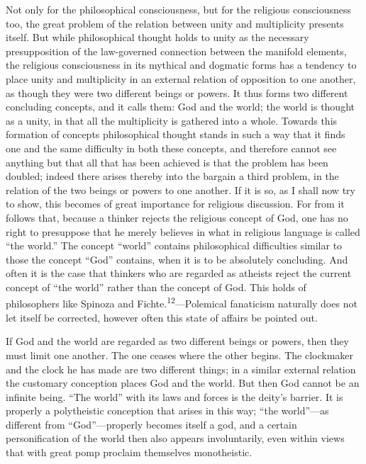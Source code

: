 \documentclass[12pt,a4paper]{book}
\newcommand{\opage}[1]{\marginnote{\footnotesize\textit{[#1]}}}
\begin{document}
Not only for the philosophical consciousness, but for the religious
consciousness too, the great problem of the relation between unity and
multiplicity presents itself. But while philosophical thought holds to unity
as the necessary presupposition of the law-governed connection between the
manifold elements, the religious consciousness in its mythical and dogmatic
forms has a tendency to place unity and multiplicity in an external relation
of opposition to one another, as though they were two different beings or
powers. It thus forms two different concluding concepts, and it calls them:
God and the world; the world is thought as a unity, in that all the
multiplicity is gathered into a whole. Towards this formation of concepts
philosophical thought stands in such a way that it finds one and the same
difficulty in both these concepts, and therefore cannot see anything but that
all that has been achieved is that the problem has been doubled; indeed there
arises thereby into the bargain a third problem, in the relation of the two
beings or powers to one another. If it is so, as I shall now try to show, this
becomes of great importance for religious discussion. For from it follows
that, because a thinker rejects the religious concept of God, one has no right
to presuppose that he merely 
\opage{36}believes in what in religious language is called
``the world.'' The concept ``world'' contains philosophical difficulties
similar to those the concept ``God'' contains, when it is to be absolutely
concluding. And often it is the case that thinkers who are regarded as
atheists reject the current concept of ``the world'' rather than the concept
of God. This holds of philosophers like Spinoza and
Fichte.\textsuperscript{12}---Polemical fanaticism naturally does not let
itself be corrected, however often this state of affairs be pointed out.

If God and the world are regarded as two different beings or powers, then they
must limit one another. The one ceases where the other begins. The clockmaker
and the clock he has made are two different things; in a similar external
relation the customary conception places God and the world. But then God
cannot be an infinite being. ``The world'' with its laws and forces is the
deity's barrier. It is properly a polytheistic conception that arises in this
way; ``the world''---as different from ``God''---properly becomes itself a
god, and a certain personification of the world then also appears
involuntarily, even within views that with great pomp proclaim themselves
monotheistic.
\end{document}
